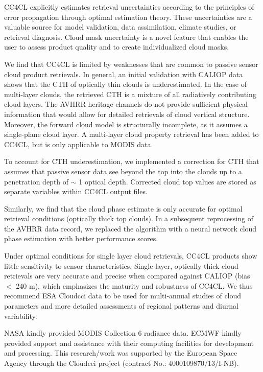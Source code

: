CC4CL explicitly estimates retrieval uncertainties according to the principles of error propagation through optimal estimation theory. These uncertainties are a valuable source for model validation, data assimilation, climate studies, or retrieval diagnosis. Cloud mask uncertainty is a novel feature that enables the user to assess product quality and to create individualized cloud masks.  %

We find that CC4CL is limited by weaknesses that are common to passive sensor cloud product retrievals. In general, an initial validation with CALIOP data shows that the CTH of optically thin clouds is underestimated. In the case of multi-layer clouds, the retrieved CTH is a mixture of all radiatively contributing cloud layers. The AVHRR heritage channels do not provide sufficient physical information that would allow for detailed retrievals of cloud vertical structure. Moreover, the forward cloud model is structurally incomplete, as it assumes a single-plane cloud layer. A multi-layer cloud property retrieval has been added to CC4CL, but is only applicable to MODIS data. 

To account for CTH underestimation, we implemented a correction for CTH that assumes that passive sensor data see beyond the top into the clouds up to a penetration depth of $\sim$ 1 optical depth. Corrected cloud top values are stored as separate variables within CC4CL output files. 

Similarly, we find that the cloud phase estimate is only accurate for optimal retrieval conditions (optically thick top clouds). In a subsequent reprocessing of the AVHRR data record, we replaced the \citet{Pavolonis05} algorithm with a neural network cloud phase estimation with better performance scores. 

Under optimal conditions for single layer cloud retrievals, CC4CL products show little sensitivity to sensor characteristics. Single layer, optically thick cloud retrievals are very accurate and precise when compared against CALIOP (bias $<$ 240 m), which emphasizes the maturity and robustness of CC4CL. We thus recommend ESA Cloud\textunderscore cci data to be used for multi-annual studies of cloud parameters and more detailed assessments of regional patterns and diurnal variability.

\begin{acknowledgements}
NASA kindly provided MODIS Collection 6 radiance data. ECMWF kindly provided support and assistance with their computing facilities for development and processing.
This research/work was supported by the European Space Agency through the Cloud\textunderscore cci project (contract No.: 4000109870/13/I-NB).
\end{acknowledgements}

